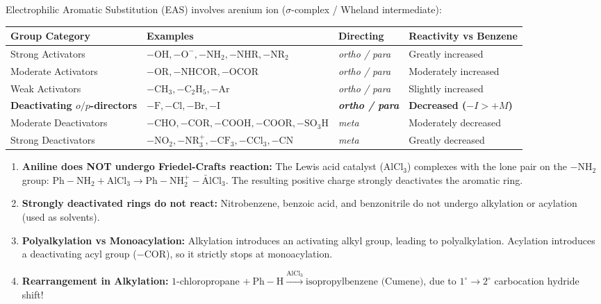 \documentclass[10pt,a4paper]{article}
\begin{document}
\begin{conceptbox}
Electrophilic Aromatic Substitution (EAS) involves arenium ion ($\sigma$-complex / Wheland intermediate):
\begin{center}
\footnotesize
\begin{tabular}{|l|l|l|l|}
\hline
\textbf{Group Category} & \textbf{Examples} & \textbf{Directing} & \textbf{Reactivity vs Benzene} \\
\hline
Strong Activators & $-\mathrm{OH}, -\mathrm{O}^-, -\mathrm{NH}_2, -\mathrm{NHR}, -\mathrm{NR}_2$ & \textit{ortho / para} & Greatly increased \\
Moderate Activators & $-\mathrm{OR}, -\mathrm{NHCOR}, -\mathrm{OCOR}$ & \textit{ortho / para} & Moderately increased \\
Weak Activators & $-\mathrm{CH}_3, -\mathrm{C_2H_5}, -\mathrm{Ar}$ & \textit{ortho / para} & Slightly increased \\
\textbf{Deactivating $o/p$-directors} & $-\mathrm{F}, -\mathrm{Cl}, -\mathrm{Br}, -\mathrm{I}$ & \textbf{\textit{ortho / para}} & \textbf{Decreased ($-I > +M$)} \\
Moderate Deactivators & $-\mathrm{CHO}, -\mathrm{COR}, -\mathrm{COOH}, -\mathrm{COOR}, -\mathrm{SO_3H}$ & \textit{meta} & Moderately decreased \\
Strong Deactivators & $-\mathrm{NO}_2, -\mathrm{NR}_3^+, -\mathrm{CF}_3, -\mathrm{CCl}_3, -\mathrm{CN}$ & \textit{meta} & Greatly decreased \\
\hline
\end{tabular}
\end{center}
\end{conceptbox}

\begin{trapbox}
\begin{enumerate}[leftmargin=*]
  \item \textbf{Aniline does NOT undergo Friedel-Crafts reaction:} The Lewis acid catalyst ($\mathrm{AlCl}_3$) complexes with the lone pair on the $-\mathrm{NH}_2$ group: $\mathrm{Ph-NH_2} + \mathrm{AlCl_3} \to \mathrm{Ph-NH_2^+-\bar{A}lCl_3}$. The resulting positive charge strongly deactivates the aromatic ring.
  \item \textbf{Strongly deactivated rings do not react:} Nitrobenzene, benzoic acid, and benzonitrile do not undergo alkylation or acylation (used as solvents).
  \item \textbf{Polyalkylation vs Monoacylation:} Alkylation introduces an activating alkyl group, leading to polyalkylation. Acylation introduces a deactivating acyl group ($-\mathrm{COR}$), so it strictly stops at monoacylation.
  \item \textbf{Rearrangement in Alkylation:} $1$-chloropropane $+\ \mathrm{Ph-H} \xrightarrow{\mathrm{AlCl_3}} \text{isopropylbenzene (Cumene)}$, due to $1^\circ \to 2^\circ$ carbocation hydride shift!
\end{enumerate}
\end{trapbox}
\end{document}
